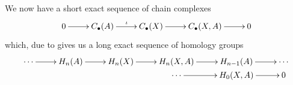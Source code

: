 We now have a short exact sequence of chain complexes
\begin{equation*}
    \xymatrix {
        0\ar[r] & C_\bullet(A)\ar[r]^\iota & C_\bullet(X)\ar[r] & C_\bullet(X,A)\ar[r] & 0
    }
\end{equation*}
which, due to  gives us a long exact sequence of homology groups
\begin{equation*}
\xymatrix@R-2pc{
    \cdots\ar[r] & H_n(A)\ar[r] & H_n(X)\ar[r] & H_n(X,A)\ar[r] & H_{n - 1}(A)\ar[r] & \cdots\\
    & & &  \cdots\ar[r] & H_0(X,A)\ar[r] & 0
}
\end{equation*}